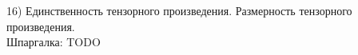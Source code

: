 16) Единственность тензорного произведения. Размерность тензорного произведения.\\

Шпаргалка: TODO\\

